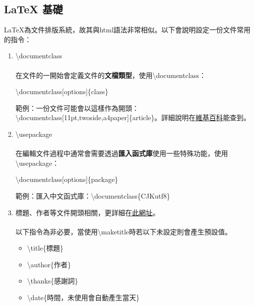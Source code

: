 \documentclass[12pt]{article}
\begin{document}
\begin{CJK*}{UTF8}{bsmi}
		\section{LaTeX 基礎}
			\hspace{25pt}LaTeX為文件排版系統，故其與html語法非常相似。以下會說明設定一份文件常用的指令： \\
			\begin{enumerate} [1.]
				\item \textbackslash documentclass \\ \\
					在文件的一開始會定義文件的\textbf{文檔類型}，使用\textbackslash documentclass：
					\begin{center}
						\textbackslash documentclass[options]\{class\}
					\end{center}
					\hspace{25pt}範例：一份文件可能會以這樣作為開頭：\textbackslash documentclass[11pt,twoside,a4paper]\{article\}。詳細說明在\href{https://zh.wikibooks.org/zh-tw/LaTeX/\%E5\%9F\%BA\%E7\%A1\%80}{維基百科}能查到。
				\item \textbackslash usepackage \\ \\
					在編輯文件過程中通常會需要透過\textbf{匯入函式庫}使用一些特殊功能，使用\textbackslash usepackage：
					\begin{center}
						\textbackslash documentclass[options]\{package\}
					\end{center}
					\hspace{25pt}範例：匯入中文函式庫：\textbackslash documentclass\{CJKutf8\}
				\item 標題、作者等文件開頭相關，更詳細在\href{https://www.overleaf.com/learn/latex/Sections_and_chapters}{此網址}。 \\ \\
					\hspace*{25pt}以下指令為非必要，當使用\textbackslash maketitle時若以下未設定則會產生預設值。
					\begin{itemize}
						\item \textbackslash title\{標題\}
						\item \textbackslash author\{作者\}
						\item \textbackslash thanks\{感謝詞\}
						\item \textbackslash date\{時間，未使用會自動產生當天\}
					\end{itemize}
			\end{enumerate}
	

\end{CJK*}
\end{document}
